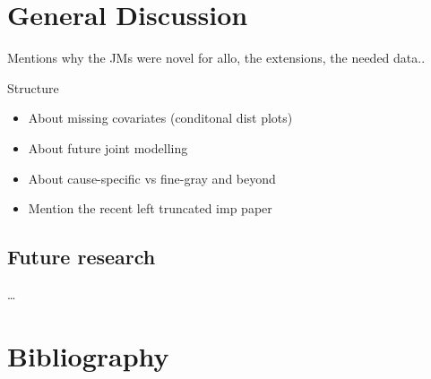 \documentclass[
  letterpaper,
  DIV=11,
  numbers=noendperiod]{scrreprt}
\begin{document}

\hypertarget{general-discussion}{%
\chapter{General Discussion}\label{general-discussion}}

Mentions why the JMs were novel for allo, the extensions, the needed
data..

Structure

\begin{itemize}
\item
  About missing covariates (conditonal dist plots)
\item
  About future joint modelling
\item
  About cause-specific vs fine-gray and beyond
\item
  Mention the recent left truncated imp paper
\end{itemize}

\hypertarget{future-research}{%
\section{Future research}\label{future-research}}

\ldots{}


\hypertarget{bibliography}{%
\chapter*{Bibliography}\label{bibliography}}

\end{document}
